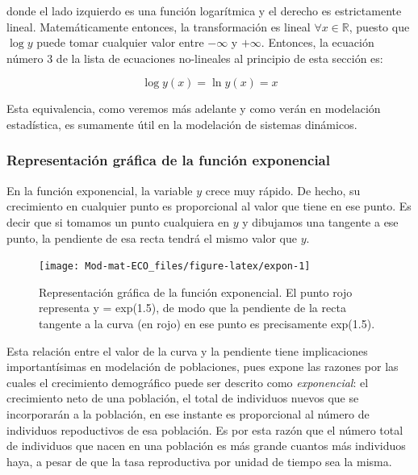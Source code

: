 \documentclass[
]{book}
\begin{document}
donde el lado izquierdo es una función logarítmica y el derecho es estrictamente lineal. Matemáticamente entonces, la transformación es lineal \(\forall x \in \mathbb{R}\), puesto que \(\log y\) puede tomar cualquier valor entre \(-\infty\) y \(+\infty\). Entonces, la ecuación número 3 de la lista de ecuaciones no-lineales al principio de esta sección es:

\[\log y(x) = \ln y(x) = x\]

Esta equivalencia, como veremos más adelante y como verán en modelación estadística, es sumamente útil en la modelación de sistemas dinámicos.

\hypertarget{representaciuxf3n-gruxe1fica-de-la-funciuxf3n-exponencial}{%
\subsubsection{Representación gráfica de la función exponencial}\label{representaciuxf3n-gruxe1fica-de-la-funciuxf3n-exponencial}}

En la función exponencial, la variable \(y\) crece muy rápido. De hecho, su crecimiento en cualquier punto es proporcional al valor que tiene en ese punto. Es decir que si tomamos un punto cualquiera en \(y\) y dibujamos una tangente a ese punto, la pendiente de esa recta tendrá el mismo valor que \(y\).

\begin{figure}

{\centering \texttt{[image: Mod-mat-ECO\_files/figure-latex/expon-1]} 

}

\caption{Representación gráfica de la función exponencial. El punto rojo representa y = exp(1.5), de modo que la pendiente de la recta tangente a la curva (en rojo) en ese punto es precisamente exp(1.5).}\label{fig:expon}
\end{figure}

Esta relación entre el valor de la curva y la pendiente tiene implicaciones importantísimas en modelación de poblaciones, pues expone las razones por las cuales el crecimiento demográfico puede ser descrito como \emph{exponencial}: el crecimiento neto de una población, el total de individuos nuevos que se incorporarán a la población, en ese instante es proporcional al número de individuos repoductivos de esa población. Es por esta razón que el número total de individuos que nacen en una población es más grande cuantos más individuos haya, a pesar de que la tasa reproductiva por unidad de tiempo sea la misma.
\end{document}
